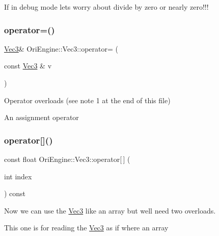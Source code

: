 If in debug mode let\textquotesingle{}s worry about divide by zero or nearly zero!!! \hypertarget{struct_ori_engine_1_1_vec3_ab162ac7e06cb783bccc3375f9c75308a}{}\label{struct_ori_engine_1_1_vec3_ab162ac7e06cb783bccc3375f9c75308a} 
\subsubsection{\texorpdfstring{operator=()}{operator=()}}
{\footnotesize\ttfamily \hyperlink{struct_ori_engine_1_1_vec3}{Vec3}\& Ori\+Engine\+::\+Vec3\+::operator= (\begin{DoxyParamCaption}\item[{const \hyperlink{struct_ori_engine_1_1_vec3}{Vec3} \&}]{v }\end{DoxyParamCaption})\hspace{0.3cm}{\ttfamily [inline]}}



Operator overloads (see note 1 at the end of this file) 

An assignment operator \hypertarget{struct_ori_engine_1_1_vec3_a536dde0bfab3d42f2bae717b3b58df62}{}\label{struct_ori_engine_1_1_vec3_a536dde0bfab3d42f2bae717b3b58df62} 
\subsubsection{\texorpdfstring{operator[]()}{operator[]()}\hspace{0.1cm}{\footnotesize\ttfamily [1/2]}}
{\footnotesize\ttfamily const float Ori\+Engine\+::\+Vec3\+::operator\mbox{[}$\,$\mbox{]} (\begin{DoxyParamCaption}\item[{int}]{index }\end{DoxyParamCaption}) const\hspace{0.3cm}{\ttfamily [inline]}}



Now we can use the \hyperlink{struct_ori_engine_1_1_vec3}{Vec3} like an array but we\textquotesingle{}ll need two overloads. 

This one is for reading the \hyperlink{struct_ori_engine_1_1_vec3}{Vec3} as if where an array \hypertarget{struct_ori_engine_1_1_vec3_a71c0ae39cb5f864517078494ea528970}{}\label{struct_ori_engine_1_1_vec3_a71c0ae39cb5f864517078494ea528970} 

